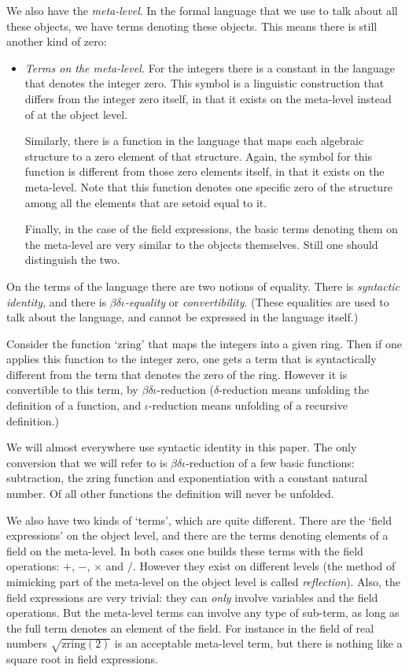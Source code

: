 \documentclass{article}
\newcommand{\zring}{\ensuremath{\mathrm{zring}}}
\begin{document}
\noindent
We also have the \emph{meta-level}.
In the formal language that we use to talk about all these objects,
we have terms denoting these objects.
This means there is still another kind of zero:
\begin{itemize}
\item
\emph{Terms on the meta-level.}
For the integers there is a constant in the language that
denotes the integer zero.
This symbol is a linguistic construction that differs from
the integer zero itself, in that it exists on the meta-level
instead of at the object level.

Similarly, there is a function in the language that maps each
algebraic structure to a zero element
of that structure.
Again, the symbol for this function is different from those zero elements itself,
in that it exists on the meta-level.
Note that this function denotes one specific zero of the structure
among all the elements that are setoid equal to it.

Finally, in the case of the field expressions, the basic terms denoting them
on the meta-level are very similar to the objects themselves.
Still one should distinguish the two.

\end{itemize}

\noindent
On the terms of the language there are two notions of equality.
There is \emph{syntactic identity}, and
there is \emph{$\beta\delta\iota$-equality} or \emph{convertibility}.
(These equalities are used to talk about the language, and cannot
be expressed in the language itself.)

Consider the function `$\zring$' that maps the integers into a given ring.
Then if one applies this function to the integer zero, one gets 
a term that is syntactically different from the term that denotes the zero of
the ring.
However it is convertible to this term, by $\beta\delta\iota$-reduction
($\delta$-reduction means unfolding the definition of a function, and
$\iota$-reduction means unfolding of a recursive definition.)

We will almost everywhere use syntactic identity in this paper.
The only conversion that we will refer to is $\beta\delta\iota$-reduction of a few
basic functions: subtraction, the $\zring$ function and exponentiation
with a constant natural number.
Of all other functions the definition will never be unfolded.

\medskip
\noindent
We also have two kinds of `terms', which are quite different.
There are the `field expressions' on the object level, and there are
the terms denoting elements of a field on the meta-level.
In both cases one builds these terms with the field operations:
$+$, $-$, $\times$ and $/$.
However they exist on different levels (the method of mimicking part of the meta-level on the
object level is called \emph{reflection}).
Also, the field expressions are very trivial:
they can \emph{only} involve variables and the field operations.
But the meta-level terms can involve any type of sub-term, as long as
the full term denotes an element of the field.
For instance in the field of real numbers $\sqrt{\zring(2)}$ is an acceptable
meta-level term,
but there is nothing like a square root in field expressions.
\end{document}
